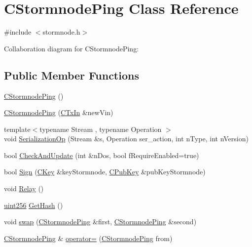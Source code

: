 \hypertarget{class_c_stormnode_ping}{}\section{C\+Stormnode\+Ping Class Reference}
\label{class_c_stormnode_ping}


{\ttfamily \#include $<$stormnode.\+h$>$}



Collaboration diagram for C\+Stormnode\+Ping\+:
\subsection*{Public Member Functions}
\begin{DoxyCompactItemize}
\item 
\hyperlink{class_c_stormnode_ping_a68d6a920cf9edf6abdd95daf7001c309}{C\+Stormnode\+Ping} ()
\item 
\hyperlink{class_c_stormnode_ping_a6c1ab32c3bb00188b9328e3b923198df}{C\+Stormnode\+Ping} (\hyperlink{class_c_tx_in}{C\+Tx\+In} \&new\+Vin)
\item 
{\footnotesize template$<$typename Stream , typename Operation $>$ }\\void \hyperlink{class_c_stormnode_ping_ab41f768e659b72da337e2f28d226c286}{Serialization\+Op} (Stream \&s, Operation ser\+\_\+action, int n\+Type, int n\+Version)
\item 
bool \hyperlink{class_c_stormnode_ping_af77ba52e9ff7531d09b61fefa372efa4}{Check\+And\+Update} (int \&n\+Dos, bool f\+Require\+Enabled=true)
\item 
bool \hyperlink{class_c_stormnode_ping_a7552ace33ea9f797431ada062ab0e2e8}{Sign} (\hyperlink{class_c_key}{C\+Key} \&key\+Stormnode, \hyperlink{class_c_pub_key}{C\+Pub\+Key} \&pub\+Key\+Stormnode)
\item 
void \hyperlink{class_c_stormnode_ping_a1f9010915780b43dffae9965531a951a}{Relay} ()
\item 
\hyperlink{classuint256}{uint256} \hyperlink{class_c_stormnode_ping_a3e2dbb87bd2fd09f87d6306606a48acb}{Get\+Hash} ()
\item 
void \hyperlink{class_c_stormnode_ping_a6d5cdf09bf1f0fef6d02e1efc3557ce1}{swap} (\hyperlink{class_c_stormnode_ping}{C\+Stormnode\+Ping} \&first, \hyperlink{class_c_stormnode_ping}{C\+Stormnode\+Ping} \&second)
\item 
\hyperlink{class_c_stormnode_ping}{C\+Stormnode\+Ping} \& \hyperlink{class_c_stormnode_ping_ac6dbda886713de4642d10872595f19c7}{operator=} (\hyperlink{class_c_stormnode_ping}{C\+Stormnode\+Ping} from)
\end{DoxyCompactItemize}
